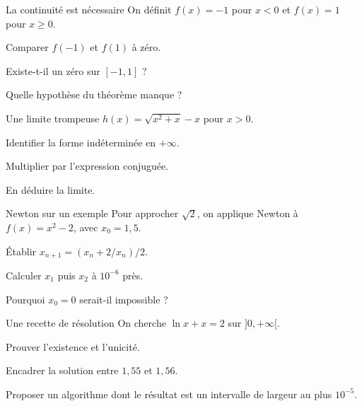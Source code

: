 \begingroup\renewcommand{\otBesoinPlace}[1]{}\begin{minipage}{\linewidth}
\begin{exercice}[3]{La continuité est nécessaire}
On définit $f(x)=-1$ pour $x<0$ et $f(x)=1$ pour $x\geq0$.
\begin{questions}
\item Comparer $f(-1)$ et $f(1)$ à zéro.
\item Existe-t-il un zéro sur $[-1,1]$ ?
\item Quelle hypothèse du théorème manque ?
\end{questions}
\end{exercice}
\begin{exercice}[3]{Une limite trompeuse}
$h(x)=\sqrt{x^2+x}-x$ pour $x>0$.
\begin{questions}
\item Identifier la forme indéterminée en $+\infty$.
\item Multiplier par l’expression conjuguée.
\item En déduire la limite.
\end{questions}
\end{exercice}
\begin{exercice}[3]{Newton sur un exemple}
Pour approcher $\sqrt2$, on applique Newton à $f(x)=x^2-2$, avec $x_0=1{,}5$.
\begin{questions}
\item Établir $x_{n+1}=(x_n+2/x_n)/2$.
\item Calculer $x_1$ puis $x_2$ à $10^{-6}$ près.
\item Pourquoi $x_0=0$ serait-il impossible ?
\end{questions}
\end{exercice}
\begin{exercice}[3]{Une recette de résolution}
On cherche $\ln x+x=2$ sur $]0,+\infty[$.
\begin{questions}
\item Prouver l’existence et l’unicité.
\item Encadrer la solution entre $1{,}55$ et $1{,}56$.
\item Proposer un algorithme dont le résultat est un intervalle de largeur au plus $10^{-5}$.
\end{questions}
\end{exercice}
\end{minipage}\endgroup
